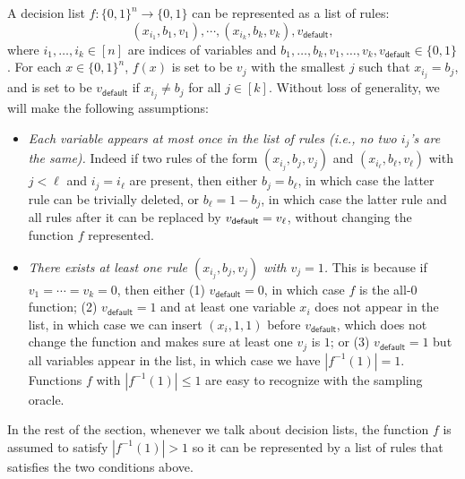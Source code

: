 \documentclass[11pt]{article}
\theoremstyle{definition}
\begin{document}
A decision list $f:\{0,1\}^n\rightarrow \{0,1\}$ can 
  be represented as a list of rules:$$
(x_{i_1}, b_1, v_1), \cdots, (x_{i_k}, b_k, v_k), v_{\textsf{default}},
$$
where $i_1,\ldots,i_k\in [n]$ are indices of variables
  and $b_1,\ldots,b_k,v_1,\ldots,v_k,v_{\textsf{default}}\in \{0,1\}$.
For each $x\in \{0,1\}^n$, $f(x)$ is set to be $v_j$ with the
  smallest $j$ such that $x_{i_j}=b_j$, and is set to be
  $v_{\textsf{default}}$ if $x_{i_j}\ne b_j$ for all $j\in [k]$.
Without loss of generality, we will make the following assumptions:
\begin{flushleft}\begin{itemize}
    \item \emph{Each variable appears at most once in the list of rules (i.e., no two $i_j$'s are the same).} Indeed if two rules of the form $(x_{i_j}, b_j,v_j)$ and $(x_{i_{\ell}}, b_{\ell}, v_{\ell})$ with $j<\ell$ and $i_j=i_{\ell}$ are present,  
    then either $b_j=b_{\ell}$, in which case 
    the latter rule can be trivially deleted,
    or $b_{\ell}=1-b_j$, in which case the latter rule and all rules after it can be replaced by $v_{\mathsf{default}}=v_{\ell}$, without changing the 
    function $f$ represented. 
    \item \emph{There exists at least one rule $(x_{i_j},b_j,v_j)$ with $v_j=1$.}
    This is because if $v_1=\cdots=v_k=0$, then either (1) $v_{\textsf{default}}=0$, in which case $f$ is the all-$0$ function; (2) $v_{\textsf{default}}=1$ and at least one variable $x_i$ does not appear in the list, in which case we can insert $(x_i,1,1)$ before $v_{\textsf{default}}$, which does not change the function and makes sure at least one $v_j$ is $1$; or (3) $v_{\textsf{default}}=1$ but all variables appear in the list, in which case we have $|f^{-1}(1)|=1$. Functions $f$ with $|f^{-1}(1)|\le 1$ are easy to recognize with the sampling oracle.
\end{itemize}\end{flushleft}
In the rest of the section, whenever we talk about 
  decision lists, the function $f$ is assumed to satisfy $|f^{-1}(1)|>1$ so it can be represented by a list of rules that satisfies the two conditions above.

 
\end{document}
